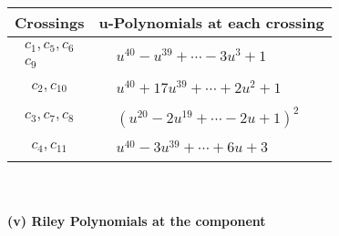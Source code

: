 \documentclass[1p]{elsarticle_modified}
\theoremstyle{definition}
\begin{document}
\begin{tabular}{m{50pt}|m{274pt}}
Crossings & \hspace{64pt}u-Polynomials at each crossing \\
\hline $$\begin{aligned}c_{1},c_{5},c_{6}\\c_{9}\end{aligned}$$&$\begin{aligned}
&u^{40}- u^{39}+\cdots-3 u^3+1
\end{aligned}$\\
\hline $$\begin{aligned}c_{2},c_{10}\end{aligned}$$&$\begin{aligned}
&u^{40}+17 u^{39}+\cdots+2 u^2+1
\end{aligned}$\\
\hline $$\begin{aligned}c_{3},c_{7},c_{8}\end{aligned}$$&$\begin{aligned}
&(u^{20}-2 u^{19}+\cdots-2 u+1)^{2}
\end{aligned}$\\
\hline $$\begin{aligned}c_{4},c_{11}\end{aligned}$$&$\begin{aligned}
&u^{40}-3 u^{39}+\cdots+6 u+3
\end{aligned}$\\
\hline
\end{tabular}\\~\\
\newpage\renewcommand{\arraystretch}{1}
\flushleft \textbf{(v) Riley Polynomials at the component}\newline \\
\end{document}
